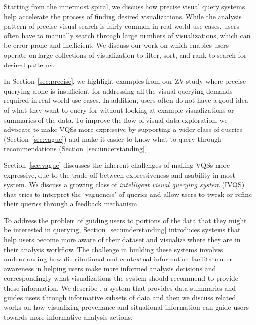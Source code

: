 \par Starting from the innermost spiral, we discuss how precise visual query systems help accelerate the process of finding desired visualizations. While the analysis pattern of precise visual search is fairly common in real-world use cases, users often have to manually search through large numbers of visualizations, which can be error-prone and inefficient. We discuss our work on \zv which enables users operate on large collections of visualization to filter, sort, and rank to search for desired patterns.
\par In Section~\ref{sec:precise}, we highlight examples from our ZV study where precise querying alone is insufficient for addressing all the visual querying demands required in real-world use cases. In addition, users often do not have a good idea of what they want to query for without looking at example visualizations or summaries of the data. To improve the flow of visual data exploration, we advocate to make VQSs more expressive by supporting a wider class of queries (Section~\ref{sec:vague}) and make it easier to know what to query through recommendations (Section~\ref{sec:understanding}).
\par Section~\ref{sec:vague} discusses the inherent challenges of making VQSs more expressive, due to the trade-off between expressiveness and usability in most system. We discuss a growing class of \textit{intelligent visual querying system} (IVQS) that tries to interpret the `vagueness' of queries and allow users to tweak or refine their queries through a feedback mechanism.
\par To address the problem of guiding users to portions of the data that they might be interested in querying, Section~\ref{sec:understanding} introduces systems that help users become more aware of their dataset and visualize where they are in their analysis workflow. The challenge in building these systems involves understanding how distributional and contextual information facilitate user awareness in helping users make more informed analysis decisions and correspondingly what visualizations the system should recommend to provide these information. We describe \sbd, a system that provides data summaries and guides users through informative subsets of data and then we discuss related works on how visualizing provenance and situational information can guide users towards more informative analysis actions.
